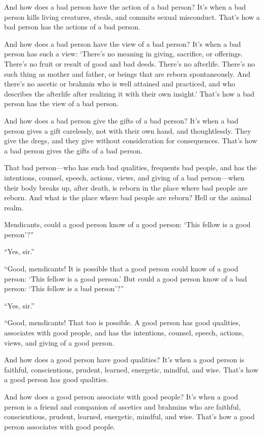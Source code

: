 \documentclass[12pt,openany]{book}%
\begin{document}
And how does a bad person have the action of a bad person? It’s when a bad person kills living creatures, steals, and commits sexual misconduct. That’s how a bad person has the actions of a bad person. 

And how does a bad person have the view of a bad person? It’s when a bad person has such a view: ‘There’s no meaning in giving, sacrifice, or offerings. There’s no fruit or result of good and bad deeds. There’s no afterlife. There’s no such thing as mother and father, or beings that are reborn spontaneously. And there’s no ascetic or brahmin who is well attained and practiced, and who describes the afterlife after realizing it with their own insight.’ That’s how a bad person has the view of a bad person. 

And how does a bad person give the gifts of a bad person? It’s when a bad person gives a gift carelessly, not with their own hand, and thoughtlessly. They give the dregs, and they give without consideration for consequences. That’s how a bad person gives the gifts of a bad person. 

That bad person—who has such bad qualities, frequents bad people, and has the intentions, counsel, speech, actions, views, and giving of a bad person—when their body breaks up, after death, is reborn in the place where bad people are reborn. And what is the place where bad people are reborn? Hell or the animal realm. 

Mendicants, could a good person know of a good person: ‘This fellow is a good person’?” 

“Yes, sir.” 

“Good, mendicants! It is possible that a good person could know of a good person: ‘This fellow is a good person.’ But could a good person know of a bad person: ‘This fellow is a bad person’?” 

“Yes, sir.” 

“Good, mendicants! That too is possible. A good person has good qualities, associates with good people, and has the intentions, counsel, speech, actions, views, and giving of a good person. 

And how does a good person have good qualities? It’s when a good person is faithful, conscientious, prudent, learned, energetic, mindful, and wise. That’s how a good person has good qualities. 

And how does a good person associate with good people? It’s when a good person is a friend and companion of ascetics and brahmins who are faithful, conscientious, prudent, learned, energetic, mindful, and wise. That’s how a good person associates with good people. 
\end{document}
